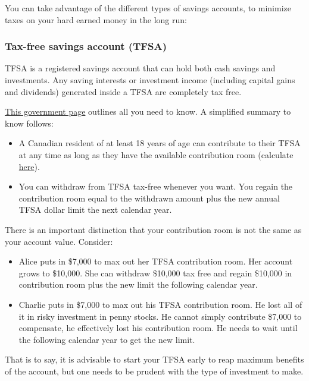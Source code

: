 You can take advantage of the different types of savings accounts, to minimize taxes on your hard earned money in the long run: 

\subsubsection{Tax-free savings account (TFSA)} 
 \label{accounts}

TFSA is a registered savings account that can hold both cash savings and investments. Any saving interests or investment income (including capital gains and dividends) generated inside a TFSA are completely tax free. 

\href{https://www.canada.ca/en/revenue-agency/services/tax/individuals/topics/tax-free-savings-account.html}{This government page} outlines all you need to know. A simplified summary to know follows:
\begin{itemize}
    \item A Canadian resident of at least 18 years of age can contribute to their TFSA at any time as long as they have the available contribution room (calculate \href{https://www.canada.ca/en/revenue-agency/services/tax/individuals/topics/tax-free-savings-account/contributing/calculate-room.html}{here}).
    \item You can withdraw from TFSA tax-free whenever you want. You regain the contribution room equal to the withdrawn amount plus the new annual TFSA dollar limit the next calendar year.
\end{itemize}

There is an important distinction that your contribution room is not the same as your account value. Consider:
\begin{itemize}
    \item Alice puts in \$7,000 to max out her TFSA contribution room. Her account grows to \$10,000. She can withdraw \$10,000 tax free and regain \$10,000 in contribution room plus the new limit the following calendar year.
    \item Charlie puts in \$7,000 to max out his TFSA contribution room. He lost all of it in risky investment in penny stocks. He cannot simply contribute \$7,000 to compensate, he effectively lost his contribution room. He needs to wait until the following calendar year to get the new limit.
\end{itemize}

That is to say, it is advisable to start your TFSA early to reap maximum benefits of the account, but one needs to be prudent with the type of investment to make.

